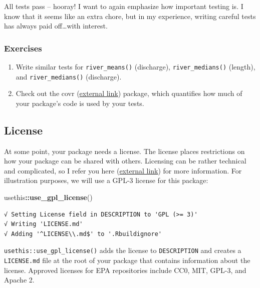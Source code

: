 \documentclass[
]{book}
\newenvironment{Shaded}{\begin{snugshade}}{\end{snugshade}}
\newcommand{\KeywordTok}[1]{\textcolor[rgb]{0.13,0.29,0.53}{\textbf{#1}}}
\newcommand{\NormalTok}[1]{#1}
\newcommand{\OperatorTok}[1]{\textcolor[rgb]{0.81,0.36,0.00}{\textbf{#1}}}
\begin{document}
All tests pass -- hooray! I want to again emphasize how important testing is. I know that it seems like an extra chore, but in my experience, writing careful tests has always paid off\ldots with interest.

\hypertarget{ex-set4}{%
\subsubsection{Exercises}\label{ex-set4}}

\begin{enumerate}
\def\labelenumi{\arabic{enumi}.}
\item
  Write similar tests for \texttt{river\_means()} (discharge), \texttt{river\_medians()} (length), and \texttt{river\_medians()} (discharge).
\item
  Check out the covr (\href{https://cran.r-project.org/web/packages/covr/vignettes/how_it_works.html}{external link}) package, which quantifies how much of your package's code is used by your tests.
\end{enumerate}

\hypertarget{license}{%
\subsection{License}\label{license}}

At some point, your package needs a license. The license places restrictions on how your package can be shared with others. Licensing can be rather technical and complicated, so I refer you here (\href{https://r-pkgs.org/license.html}{external link}) for more information. For illustration purposes, we will use a GPL-3 license for this package:

\begin{Shaded}
\begin{Highlighting}[]
\NormalTok{usethis}\OperatorTok{::}\KeywordTok{use_gpl_license}\NormalTok{()}
\end{Highlighting}
\end{Shaded}

\begin{verbatim}
√ Setting License field in DESCRIPTION to 'GPL (>= 3)'
√ Writing 'LICENSE.md'
√ Adding '^LICENSE\\.md$' to '.Rbuildignore'
\end{verbatim}

\texttt{usethis::use\_gpl\_license()} adds the license to \texttt{DESCRIPTION} and creates a \texttt{LICENSE.md} file at the root of your package that contains information about the license. Approved licenses for EPA repositories include CC0, MIT, GPL-3, and Apache 2.
\end{document}

